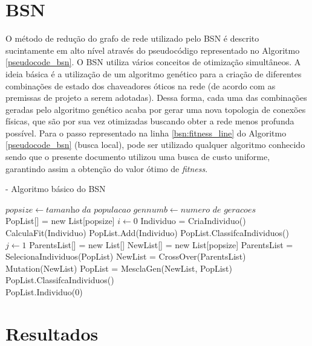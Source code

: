 \section{BSN}
O método de redução do grafo de rede utilizado pelo BSN é descrito sucintamente em alto nível através do pseudocódigo representado no Algoritmo \ref{pseudocode_bsn}. O BSN utiliza vários conceitos de otimização simultâneos. A ideia básica é a utilização de um algoritmo genético para a criação de diferentes combinações de estado dos chaveadores óticos na rede (de acordo com as premissas de projeto a serem adotadas). Dessa forma, cada uma das combinações geradas pelo algoritmo genético acaba por gerar uma nova topologia de conexões físicas, que são por sua vez otimizadas buscando obter a rede menos profunda possível. Para o passo representado na linha \ref{bsn:fitness_line} do Algoritmo \ref{pseudocode_bsn} (busca local), pode ser utilizado qualquer algoritmo conhecido sendo que o presente documento utilizou uma busca de custo uniforme, garantindo assim a obtenção do valor ótimo de \emph{fitness}.

\begin{algorithm} [h]
\caption{ - Algoritmo básico do BSN}
\begin{algorithmic}[1]
\State $popsize\gets \textit{tamanho da populacao}$
\State $gennumb\gets \textit{numero de geracoes}$\\
\State PopList[] = new List[popsize]
\State $i\gets 0$
\State Individuo = CriaIndividuo()
\State CalculaFit(Individuo)\label{bsn:fitness_line}
\State PopList.Add(Individuo)
\State PopList.ClassifcaIndividuos()
\EndWhile{}\\
\State $j\gets 1$
\State ParentsList[] = new List[]
\State NewList[] = new List[popsize]
\State ParentsList = SelecionaIndividuos(PopList)
\State NewList = CrossOver(ParentsList)
\State Mutation(NewList)
\State PopList = MesclaGen(NewList, PopList)
\State PopList.ClassifcaIndividuos()
\EndWhile\\
\State\Return PopList.Individuo(0)
\end{algorithmic}
\label{pseudocode_bsn}
\end{algorithm}

\section{Resultados}